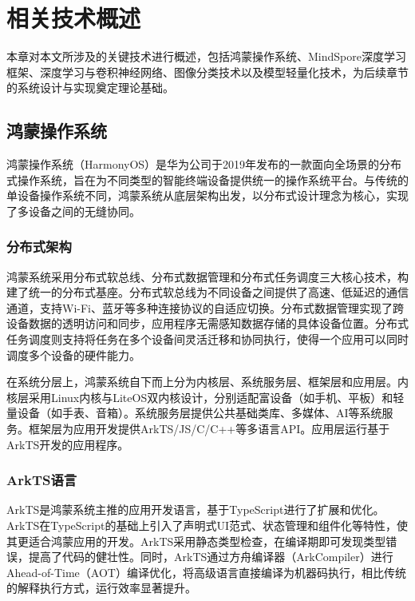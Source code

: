 \chapter{相关技术概述}

本章对本文所涉及的关键技术进行概述，包括鸿蒙操作系统、MindSpore深度学习框架、深度学习与卷积神经网络、图像分类技术以及模型轻量化技术，为后续章节的系统设计与实现奠定理论基础。

\section{鸿蒙操作系统}

鸿蒙操作系统（HarmonyOS）是华为公司于2019年发布的一款面向全场景的分布式操作系统，旨在为不同类型的智能终端设备提供统一的操作系统平台\cite{huawei2021harmony}。与传统的单设备操作系统不同，鸿蒙系统从底层架构出发，以分布式设计理念为核心，实现了多设备之间的无缝协同。

\subsection{分布式架构}

鸿蒙系统采用分布式软总线、分布式数据管理和分布式任务调度三大核心技术，构建了统一的分布式基座。分布式软总线为不同设备之间提供了高速、低延迟的通信通道，支持Wi-Fi、蓝牙等多种连接协议的自适应切换。分布式数据管理实现了跨设备数据的透明访问和同步，应用程序无需感知数据存储的具体设备位置。分布式任务调度则支持将任务在多个设备间灵活迁移和协同执行，使得一个应用可以同时调度多个设备的硬件能力。

在系统分层上，鸿蒙系统自下而上分为内核层、系统服务层、框架层和应用层。内核层采用Linux内核与LiteOS双内核设计，分别适配富设备（如手机、平板）和轻量设备（如手表、音箱）。系统服务层提供公共基础类库、多媒体、AI等系统服务。框架层为应用开发提供ArkTS/JS/C/C++等多语言API。应用层运行基于ArkTS开发的应用程序。

\subsection{ArkTS语言}

ArkTS是鸿蒙系统主推的应用开发语言，基于TypeScript进行了扩展和优化。ArkTS在TypeScript的基础上引入了声明式UI范式、状态管理和组件化等特性，使其更适合鸿蒙应用的开发。ArkTS采用静态类型检查，在编译期即可发现类型错误，提高了代码的健壮性。同时，ArkTS通过方舟编译器（ArkCompiler）进行 Ahead-of-Time（AOT）编译优化，将高级语言直接编译为机器码执行，相比传统的解释执行方式，运行效率显著提升。

